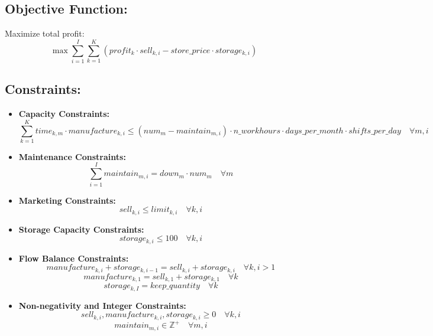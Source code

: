 \documentclass{article}
\begin{document}
\subsection*{Objective Function:}
Maximize total profit:
\[
\max \sum_{i=1}^{I} \sum_{k=1}^{K} \left( profit_k \cdot sell_{k,i} - store\_price \cdot storage_{k,i} \right)
\]

\subsection*{Constraints:}

\begin{itemize}
    \item \textbf{Capacity Constraints:} 
    \[
    \sum_{k=1}^{K} time_{k,m} \cdot manufacture_{k,i} \leq (num_{m} - maintain_{m,i}) \cdot n\_workhours \cdot days\_per\_month \cdot shifts\_per\_day \quad \forall m, i
    \]

    \item \textbf{Maintenance Constraints:} 
    \[
    \sum_{i=1}^{I} maintain_{m,i} = down_{m} \cdot num_{m} \quad \forall m
    \]

    \item \textbf{Marketing Constraints:}
    \[
    sell_{k,i} \leq limit_{k,i} \quad \forall k, i
    \]

    \item \textbf{Storage Capacity Constraints:}
    \[
    storage_{k,i} \leq 100 \quad \forall k, i
    \]

    \item \textbf{Flow Balance Constraints:}
    \[
    manufacture_{k,i} + storage_{k,i-1} = sell_{k,i} + storage_{k,i} \quad \forall k, i > 1
    \]
    \[
    manufacture_{k,1} = sell_{k,1} + storage_{k,1} \quad \forall k
    \]
    \[
    storage_{k,I} = keep\_quantity \quad \forall k
    \]

    \item \textbf{Non-negativity and Integer Constraints:}
    \[
    sell_{k,i}, manufacture_{k,i}, storage_{k,i} \geq 0 \quad \forall k, i
    \]
    \[
    maintain_{m,i} \in \mathbb{Z}^+ \quad \forall m, i
    \]
\end{itemize}
\end{document}
